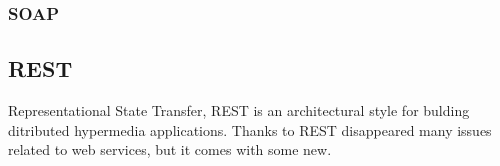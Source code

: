 \subsubsection{SOAP}

\subsection{REST}

Representational State Transfer, REST is an architectural style for bulding ditributed hypermedia applications.
Thanks to REST disappeared many issues related to web services, but it comes with some new.

    

